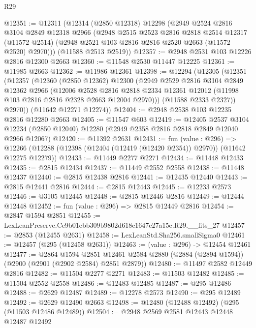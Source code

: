 \begin{lexlean}{R29}
\begin{coremodule}
@12351 := @12311
    (@12314
      (@2850 @12318)
      @12298
      (@2949
        @2524
        @2816
        @3104
        @2849
        @12318
        @2966
        (@2948
          @2515
          @2523
          @2816
          @2818
          @2514
          @12317
          (@11572 @2514)
          (@2948 @2521 @103 @2816 @2816 @2520 @2663 (@11572 @2520) @2970)))
      (@11588 @2513 @2519))
@12357 := @2948 @2531 @103 @12226 @2816 @12300 @2663
@12360 := @11548 @2530 @11447 @12225
@12361 := @11985 @2663
@12362 := @11986 @12361
@12398 := @12294
    (@12305
      (@12351
        (@12357
          (@12360
            (@2850 @12362)
            @12300
            (@2949
              @2529
              @2816
              @3104
              @2849
              @12362
              @2966
              (@12006
                @2528
                @2816
                @2818
                @2334
                @12361
                @12012
                (@11998 @103 @2816 @2816 @2328 @2663 @12004 @2970)))
            (@11588 @2333 @2327))
          @2970))
      (@11642 @12271 @12274))
@12404 := @2948 @2538 @103 @12235 @2816 @12280 @2663
@12405 := @11547 @603
@12419 := @12405
    @2537
    @3104
    @12234
    (@2850 @12040)
    @12280
    (@2949 @2358 @2816 @2818 @2849 @12040 @2966 @12067)
@12420 := @11392 @2631
@12431 := fun (value : @296) =>
  @12266 (@12288 (@12398 (@12404 (@12419 (@12420 @2354)) @2970)) (@11642 @12275 @12279))
@12433 := @11449 @2277 @2271
@12434 := @11448 @12433
@12435 := @2815 @12434
@12437 := @11449 @2552 @2558
@12438 := @11448 @12437
@12440 := @2815 @12438 @2816
@12441 := @12435 @12440
@12443 := @2815 @12441 @2816
@12444 := @2815 @12443
@12445 := @12233 @2573
@12446 := @3105 @12445
@12448 := @2815 @12446 @2816
@12449 := @12444 @12448
@12452 := fun (value : @296) => @2815 @12449 @2816
@12454 := @2847 @1594 @2851
@12455 := LexLeanPreserve.Ce9b01ebb309b9802d618c1647c27a15e.R29.__fits_27
@12457 := @2853 (@12455 @2631)
@12458 := LexLeanStd.Sha256.smallSigma0
@12461 := @12457 (@295 (@12458 @2631))
@12463 := (value : @296) -> @12454 @12461
@12477 := @2864
    @1594
    @2851
    @12461
    @2584
    @2880
    (@2884 (@2894 @1594))
    (@2900 (@2901 (@2902 @2584) @2851 @2879))
@12480 := @11497 @2582 @12449 @2816
@12482 := @11504 @2277 @2271
@12483 := @11503 @12482
@12485 := @11504 @2552 @2558
@12486 := @12483 @12485
@12487 := @295 @12486
@12488 := @2629 @12487
@12489 := @12278 @2573
@12490 := @295 @12489
@12492 := @2629 @12490 @2663
@12498 := @12480 (@12488 @12492) (@295 (@11503 @12486 @12489))
@12504 := @2948 @2569 @2581 @12443 @12448 @12487 @12492

\end{coremodule}
\end{lexlean}
